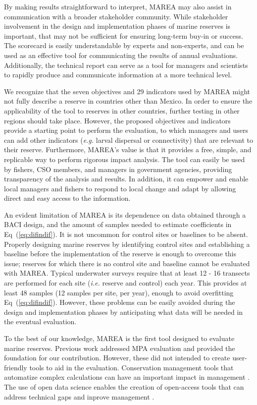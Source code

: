 \documentclass[10pt,letterpaper]{article}
\begin{document}
By making results straightforward to interpret, MAREA may also assist in communication with a broader stakeholder community. While stakeholder involvement in the design and implementation phases of marine reserves is important, that may not be sufficient for ensuring long-term buy-in or success. The scorecard is easily understandable by experts and non-experts, and can be used as an effective tool for communicating the results of annual evaluations. Additionally, the technical report can serve as a tool for managers and scientists to rapidly produce and communicate information at a more technical level.

We recognize that the seven objectives and 29 indicators used by MAREA might not fully describe a reserve in countries other than Mexico. In order to ensure the applicability of the tool to reserves in other countries, further testing in other regions should take place. However, the proposed objectives and indicators provide a starting point to perform the evaluation, to which managers and users can add other indicators (\emph{e.g.} larval dispersal or connectivity) that are relevant to their reserve. Furthermore, MAREA's value is that it provides a free, simple, and replicable way to perform rigorous impact analysis. The tool can easily be used by fishers, CSO members, and managers in government agencies, providing transparency of the analysis and results. In addition, it can empower and enable local managers and fishers to respond to local change and adapt by allowing direct and easy access to the information.

An evident limitation of MAREA is its dependence on data obtained through a BACI design, and the amount of samples needed to estimate coefficients in Eq~(\ref{eq:difindif}). It is not uncommon for control sites or baselines to be absent. Properly designing marine reserves by identifying control sites and establishing a baseline before the implementation of the reserve is enough to overcome this issue; reserves for which there is no control site and baseline cannot be evaluated with MAREA. Typical underwater surveys require that at least 12 - 16 transects are performed for each site (\emph{i.e.} reserve and control) each year. This provides at least 48 samples (12 samples per site, per year), enough to avoid overfitting Eq~(\ref{eq:difindif}). However, these problems can be easily avoided during the design and implementation phases by anticipating what data will be needed in the eventual evaluation.

To the best of our knowledge, MAREA is the first tool designed to evaluate marine reserves. Previous work \cite{pomeroy_2005-Py,mascia_2017-m_} addressed MPA evaluation and provided the foundation for our contribution. However, these did not intended to create user-friendly tools to aid in the evaluation. Conservation management tools that automatize complex calculations can have an important impact in management \cite{ball_2009}. The use of open data science enables the creation of open-access tools that can address technical gaps and inprove management \cite{lowndes_2017-xh}.
\end{document}
